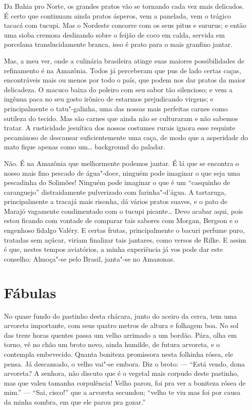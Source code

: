 Da Bahia pro Norte, os grandes pratos vão se tornando cada vez mais
delicados. É certo que continuam ainda pratos ásperos, vem a panelada,
vem o trágico tacacá com tucupi. Mas o Nordeste concorre com os seus
pitus e sururus; e então uma sioba cremosa deslizando sobre o feijão de
coco em calda, servida em porcelana translucidamente branca, isso é
prato para o mais granfino jantar.

Mas, a meu ver, onde a culinária brasileira atinge suas maiores
possibilidades de refinamento é na Amazônia. Todos já perceberam que pus
de lado certas caças, encontráveis mais ou menos por todo o país, que
podem nos dar pratos da maior delicadeza. O macuco baixa do poleiro com
seu sabor tão silencioso; e vem a ingênua paca no seu gosto irônico de
estarmos prejudicando virgens; e principalmente o tatu"-galinha, uma das
nossas mais perfeitas carnes como sutileza do tecido. Mas são carnes que
ainda não se culturaram e não sabemos tratar. A rusticidade jesuítica
dos nossos costumes rurais ignora esse requinte pecaminoso de descansar
suficientemente uma caça, de modo que a asperidade do mato fique apenas
como um\ldots{} background do paladar.

Não. É na Amazônia que melhormente podemos jantar. É lá que se encontra
o nosso mais fino pescado de água"-doce, ninguém pode imaginar o que seja
uma pescadinha do Solimões! Ninguém pode imaginar o que é um ``casquinho
de caranguejo'' distraidamente pulverizado com farinha"-d'água. A
tartaruga, principalmente a tracajá mais risonha, dá vários pratos
suaves, e o pato de Marajó vagamente condimentado com o tucupi
picante\ldots{} Devo acabar aqui, pois estou ficando com vontade de comparar
tais sabores com Morgan, Bergson e o engenhoso fidalgo Valéry. E certas
frutas, principalmente o bacuri perfume puro, tratadas sem açúcar,
viriam finalizar tais jantares, como versos de Rilke. E assim é que,
nestes tempos aviatórios, a minha experiência já vos pode dar este
conselho: Almoça"-se pelo Brasil, janta"-se no Amazonas.

\chapter{Fábulas}

No quase fundo do pastinho desta chácara, junto do aceiro da cerca, tem
uma arvoreta importante, com seus quatro metros de altura e folhagem
boa. No sol das treze horas quentes passa um velho arrimado a um bordão.
Pára, olha em torno, vê no chão um broto novo, ainda humilde, de futura
arvoreta, e o contempla embevecido. Quanta boniteza promissora nesta
folhinha rósea, ele pensa. Já descansado, o velho vai"-se embora. Diz o
broto: --- ``Está vendo, dona arvoreta? A senhora, não discuto que é o
vegetal mais corpudo deste pastinho, mas que valeu tamanha corpulência!
Velho parou, foi pra ver a boniteza rósea de mim.'' --- ``Sai, cisco!'' que
a arvoreta secundou; ``velho te viu mas foi por causa da minha sombra, em
que ele parou pra gozar.''

